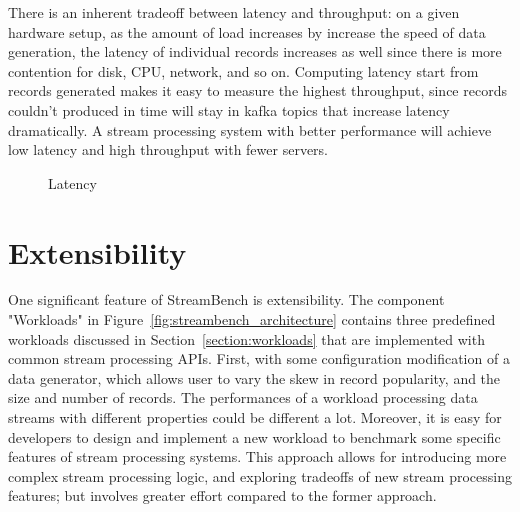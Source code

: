 There is an inherent tradeoff between latency and throughput: on a given hardware setup, as the amount of load increases by increase the speed of data generation, the latency of individual records increases as well since there is more contention for disk, CPU, network, and so on. Computing latency start from records generated makes it easy to measure the highest throughput, since records couldn't produced in time will stay in kafka topics that increase latency dramatically. A stream processing system with better performance will achieve low latency and high throughput with fewer servers.

\begin{figure}
  \begin{center}
   \caption{Latency}
   \label{fig:latency}
  \end{center}
\end{figure}

\section{Extensibility}
\label{section:extensibility}

One significant feature of StreamBench is extensibility. The component "Workloads" in Figure~\ref{fig:streambench_architecture} contains three predefined workloads discussed in Section~\ref{section:workloads} that are implemented with common stream processing APIs. First, with some configuration modification of a data generator, which allows user to vary the skew in record popularity, and the size and number of records. The performances of a workload processing data streams with different properties could be different a lot. Moreover, it is easy for developers to design and implement a new workload to benchmark some specific features of stream processing systems. This approach allows for introducing more complex stream processing logic, and exploring tradeoffs of new stream processing features; but involves greater effort compared to the former approach.

